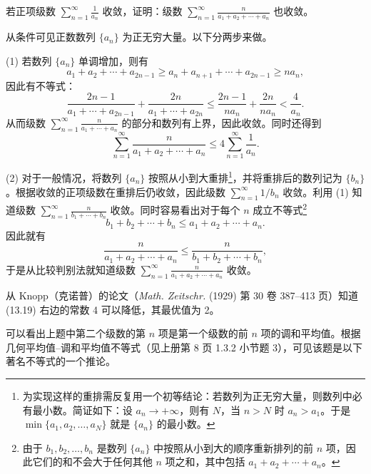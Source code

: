 \begin{xexample}[13.2.6]
若正项级数 $\sum_{n=1}^{\infty}\frac1{a_n}$ 收敛，证明：级数 $\sum_{n=1}^{\infty}\frac{n}{a_1+a_2+\cdots+a_n}$ 也收敛。
\end{xexample}
\begin{xproof}
从条件可见正数数列 $\{a_n\}$ 为正无穷大量。以下分两步来做。

(1) 若数列 $\{a_n\}$ 单调增加，则有
\[
a_1+a_2+\cdots+a_{2n-1}\geq a_n+a_{n+1}+\cdots+a_{2n-1}\geq na_n,
\]
因此有不等式：
\[
\frac{2n-1}{a_1+\cdots+a_{2n-1}}+\frac{2n}{a_1+\cdots+a_{2n}}
\leq\frac{2n-1}{na_n}+\frac{2n}{na_n}<\frac4{a_n}.
\]
从而级数 $\sum_{n=1}^{\infty}\frac{n}{a_1+\cdots+a_n}$ 的部分和数列有上界，因此收敛。同时还得到
\begin{equation}
\sum_{n=1}^{\infty}\frac{n}{a_1+a_2+\cdots+a_n}\leq4\sum_{n=1}^{\infty}\frac1{a_n}.
\tag{13.19}
\end{equation}

(2) 对于一般情况，将数列 $\{a_n\}$ 按照从小到大重排\footnote{为实现这样的重排需反复用一个初等结论：若数列为正无穷大量，则数列中必有最小数。简证如下：设 $a_n\to+\infty$，则有 $N$，当 $n>N$ 时 $a_n>a_1$。于是 $\min\{a_1,a_2,\ldots,a_N\}$ 就是 $\{a_n\}$ 的最小数。}，并将重排后的数列记为 $\{b_n\}$。根据收敛的正项级数在重排后仍收敛，因此级数 $\sum_{n=1}^{\infty}1/b_n$ 收敛。利用 (1) 知道级数 $\sum_{n=1}^{\infty}\frac{n}{b_1+\cdots+b_n}$ 收敛。同时容易看出对于每个 $n$ 成立不等式\footnote{由于 $b_1,b_2,\ldots,b_n$ 是数列 $\{a_n\}$ 中按照从小到大的顺序重新排列的前 $n$ 项，因此它们的和不会大于任何其他 $n$ 项之和，其中包括 $a_1+a_2+\cdots+a_n$。}
\begin{equation}
b_1+b_2+\cdots+b_n\leq a_1+a_2+\cdots+a_n.
\tag{13.20}
\end{equation}
因此就有
\[
\frac{n}{a_1+a_2+\cdots+a_n}\leq\frac{n}{b_1+b_2+\cdots+b_n},
\]
于是从比较判别法就知道级数 $\sum_{n=1}^{\infty}\frac{n}{a_1+a_2+\cdots+a_n}$ 收敛。
\end{xproof}

\begin{xremark}
从 Knopp（克诺普）的论文（\textit{Math. Zeitschr.} (1929) 第 30 卷 387--413 页）知道 (13.19) 右边的常数 4 可以降低，其最优值为 2。
\end{xremark}

可以看出上题中第二个级数的第 $n$ 项是第一个级数的前 $n$ 项的调和平均值。根据几何平均值--调和平均值不等式（见上册第 8 页 1.3.2 小节题 3），可见该题是以下著名不等式的一个推论。

